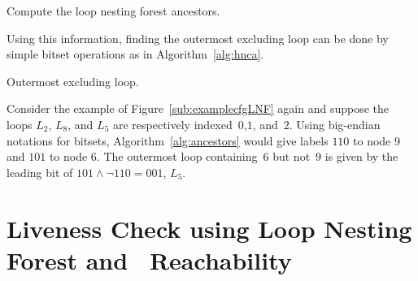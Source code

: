 \begin{algorithm}
\caption{Compute the loop nesting forest ancestors.}
\label{alg:ancestors}
\end{algorithm}

Using this information, finding the outermost excluding loop can be done by simple bitset operations as in Algorithm~\ref{alg:hnca}.

\begin{algorithm}
\caption{Outermost excluding loop.}
\label{alg:hnca}
\end{algorithm}

\begin{example}
	Consider the example of Figure~\ref{sub:examplecfgLNF} again and suppose the loops $L_2$, $L_8$, and $L_5$ are respectively indexed~$0$,$1$, and~$2$.
	Using big-endian notations for bitsets, Algorithm~\ref{alg:ancestors} would give labels $110$ to node $9$ and $101$ to node $6$.
	The outermost loop containing~$6$ but not~$9$ is given by the leading bit of $101\wedge \lnot 110=001$, \ie $L_5$.
\end{example}



\section{Liveness Check using Loop Nesting Forest and \Reduced\ Reachability}
\label{sec:live-check}



